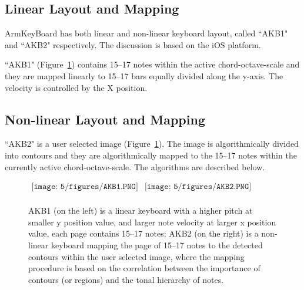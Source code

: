 \subsection{Linear Layout and Mapping}
ArmKeyBoard has both linear and non-linear keyboard layout, called ``AKB1" and ``AKB2" respectively. The discussion is based on the iOS platform.

``AKB1" (Figure~\ref{fig:5-AKB12}) contains 15--17 notes within the active chord-octave-scale and they are mapped linearly to 15--17
bars equally divided along the y-axis. The velocity is controlled by the X position.

\subsection{Non-linear Layout and Mapping}
``AKB2" is a user selected image (Figure~\ref{fig:5-AKB12}). The image is algorithmically divided into contours and they are algorithmically mapped to the 15--17 notes within the currently active chord-octave-scale. The algorithms are described below.
\begin{figure}[htbp]
\begin{center}$
\begin{array}{cc}
\texttt{[image: 5/figures/AKB1.PNG]} &
\texttt{[image: 5/figures/AKB2.PNG]} \\
\end{array}$
\end{center}
\caption{AKB1 (on the left) is a linear keyboard with a higher pitch at smaller y position value, and larger note velocity at larger x position value, each page contains 15--17 notes; AKB2 (on the right) is a non-linear keyboard mapping the page of 15--17 notes to the detected contours within the user selected image, where the mapping procedure is based on the correlation between the importance of contours (or regions) and the tonal hierarchy of notes.}
\label{fig:5-AKB12}
\end{figure}

